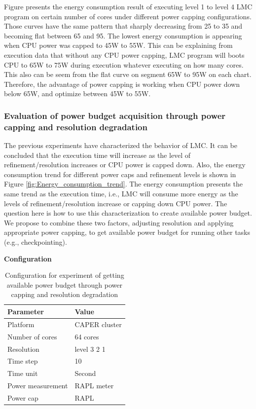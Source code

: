 \noindent

Figure presents the energy consumption result of executing level 1 to level 4 LMC program on certain number of cores under different power capping configurations. Those curves have the same pattern that sharply decreasing from 25 to 35 and becoming flat between 65 and 95. The lowest energy consumption is appearing when CPU power was capped to 45W to 55W. This can be explaining from execution data that without any CPU power capping, LMC program will boots CPU to 65W to 75W during execution whatever executing on how many cores. This also can be seem from the flat curve on segment 65W to 95W on each chart. Therefore, the advantage of power capping is working when CPU power down below 65W, and optimize between 45W to 55W. 



\subsubsection{Evaluation of power budget acquisition through power capping and resolution degradation}
The previous experiments have characterized the behavior of LMC. It can be concluded that the execution time will increase as the level of refinement/resolution increases or CPU power is capped down. Also, the energy consumption trend for different power caps and refinement levels is shown in Figure \ref{fig:Energy_consumption_trend}. The energy consumption presents the same trend as the execution time, i.e., LMC will consume more energy as the levels of refinement/resolution increase or capping down CPU power. The question here is how to use this characterization to create available power budget. We propose to combine these two factors, adjusting resolution and applying appropriate power capping, to get available power budget for running other tasks (e.g., checkpointing). 


\textbf{Configuration}
\begin{table}[H]
\begin{center}
\begin{tabular}{|l|l|}
	\hline
	\textbf{Parameter} & \textbf{Value}\\ \hline
    Platform & CAPER cluster\\ 		\hline
    Number of cores & 64 cores\\
	\hline
	Resolution & level 3 2 1\\
    \hline
    Time step & 10\\
    \hline
    Time unit & Second\\
    \hline
    Power measurement & RAPL meter\\
    \hline
    Power cap & RAPL\\
    \hline
\end{tabular}
\end{center}
\caption{Configuration for experiment of getting available power budget through power capping and resolution degradation
}
\label{table:table_tradeoff}
\end{table}



